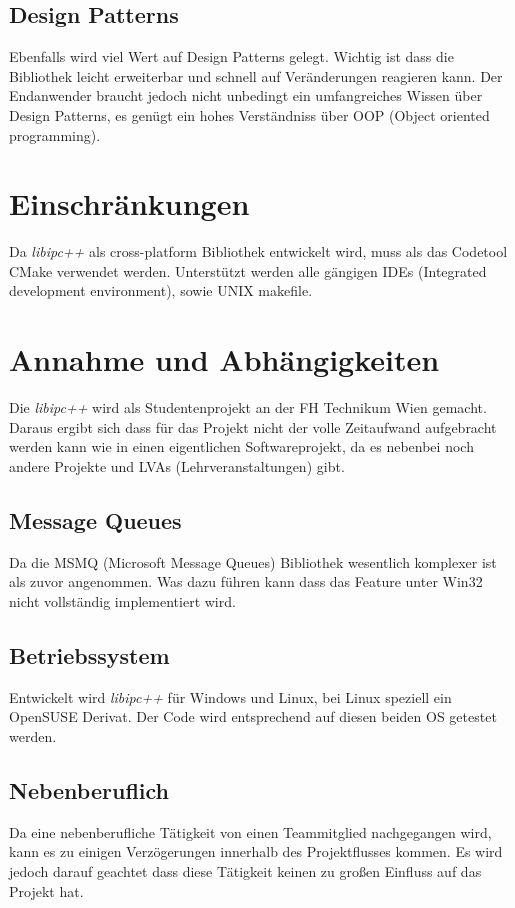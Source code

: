 \documentclass[a4paper]{book}
\begin{document}
\subsection{Design Patterns}
Ebenfalls wird viel Wert auf Design Patterns gelegt. Wichtig ist dass die Bibliothek leicht erweiterbar und schnell auf Veränderungen reagieren kann. Der Endanwender braucht jedoch nicht unbedingt ein umfangreiches Wissen über Design Patterns, es genügt ein hohes Verständniss über OOP (Object oriented programming).

\section{Einschränkungen}
Da \textit{libipc++} als cross-platform Bibliothek entwickelt wird, muss als das Codetool CMake verwendet werden. Unterstützt werden alle gängigen IDEs (Integrated development environment), sowie UNIX makefile.

\section{Annahme und Abhängigkeiten}
Die \textit{libipc++} wird als Studentenprojekt an der FH Technikum Wien gemacht. Daraus ergibt sich dass für das Projekt nicht der volle Zeitaufwand aufgebracht werden kann wie in einen eigentlichen Softwareprojekt, da es nebenbei noch andere Projekte und LVAs (Lehrveranstaltungen) gibt.

\subsection{Message Queues}
Da die MSMQ (Microsoft Message Queues) Bibliothek wesentlich komplexer ist als zuvor angenommen. Was dazu führen kann dass das Feature unter Win32 nicht vollständig implementiert wird.

\subsection{Betriebssystem}
Entwickelt wird \textit{libipc++} für Windows und Linux, bei Linux speziell ein OpenSUSE Derivat. Der Code wird entsprechend auf diesen beiden OS getestet werden.

\subsection{Nebenberuflich}
Da eine nebenberufliche Tätigkeit von einen Teammitglied nachgegangen wird, kann es zu einigen Verzögerungen innerhalb des Projektflusses kommen. Es wird jedoch darauf geachtet dass diese Tätigkeit keinen zu großen Einfluss auf das Projekt hat.
\end{document}
